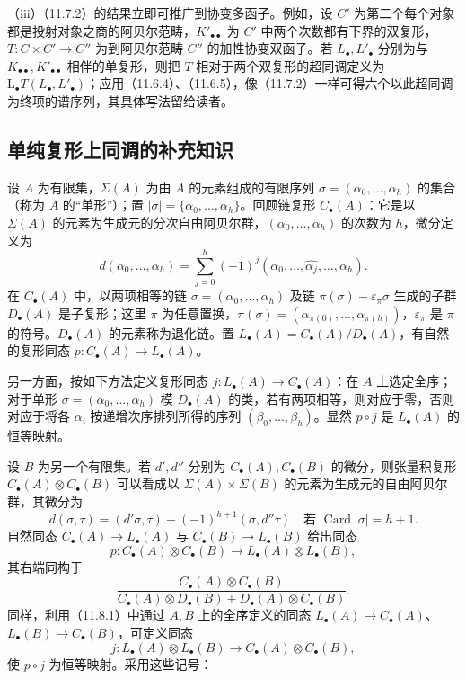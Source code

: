 （iii）（11.7.2）的结果立即可推广到协变多函子。例如，设 $C'$ 为第二个每个对象都是投射对象之商的阿贝尔范畴，$K'_{\bullet\bullet}$ 为 $C'$ 中两个次数都有下界的双复形，$T:C\times C'\to C''$ 为到阿贝尔范畴 $C''$ 的加性协变双函子。若 $L_\bullet,L'_\bullet$ 分别为与 $K_{\bullet\bullet},K'_{\bullet\bullet}$ 相伴的单复形，则把 $T$ 相对于两个双复形的超同调定义为 $\mathrm L_\bullet T(L_\bullet,L'_\bullet)$；应用（11.6.4）、（11.6.5），像（11.7.2）一样可得六个以此超同调为终项的谱序列，其具体写法留给读者。\par

\subsection{单纯复形上同调的补充知识}
设 $A$ 为有限集，$\Sigma(A)$ 为由 $A$ 的元素组成的有限序列 $\sigma=(\alpha_0,\ldots,\alpha_h)$ 的集合（称为 $A$ 的“单形”）；置 $|\sigma|=\{\alpha_0,\ldots,\alpha_h\}$。回顾链复形 $C_\bullet(A)$：它是以 $\Sigma(A)$ 的元素为生成元的分次自由阿贝尔群，$(\alpha_0,\ldots,\alpha_h)$ 的次数为 $h$，微分定义为
\[
d(\alpha_0,\ldots,\alpha_h)
=\sum_{j=0}^h(-1)^j(\alpha_0,\ldots,\widehat{\alpha_j},\ldots,\alpha_h).
\]
在 $C_\bullet(A)$ 中，以两项相等的链 $\sigma=(\alpha_0,\ldots,\alpha_h)$ 及链 $\pi(\sigma)-\varepsilon_\pi\sigma$ 生成的子群 $D_\bullet(A)$ 是子复形；这里 $\pi$ 为任意置换，$\pi(\sigma)=(\alpha_{\pi(0)},\ldots,\alpha_{\pi(h)})$，$\varepsilon_\pi$ 是 $\pi$ 的符号。$D_\bullet(A)$ 的元素称为退化链。置 $L_\bullet(A)=C_\bullet(A)/D_\bullet(A)$，有自然的复形同态 $p:C_\bullet(A)\to L_\bullet(A)$。

另一方面，按如下方法定义复形同态 $j:L_\bullet(A)\to C_\bullet(A)$：在 $A$ 上选定全序；对于单形 $\sigma=(\alpha_0,\ldots,\alpha_h)$ 模 $D_\bullet(A)$ 的类，若有两项相等，则对应于零，否则对应于将各 $\alpha_i$ 按递增次序排列所得的序列 $(\beta_0,\ldots,\beta_h)$。显然 $p\circ j$ 是 $L_\bullet(A)$ 的恒等映射。

设 $B$ 为另一个有限集。若 $d',d''$ 分别为 $C_\bullet(A),C_\bullet(B)$ 的微分，则张量积复形 $C_\bullet(A)\otimes C_\bullet(B)$ 可以看成以 $\Sigma(A)\times\Sigma(B)$ 的元素为生成元的自由阿贝尔群，其微分为
\[
d(\sigma,\tau)=(d'\sigma,\tau)+(-1)^{h+1}(\sigma,d''\tau)
\quad\text{若 }\operatorname{Card}|\sigma|=h+1.
\]
自然同态 $C_\bullet(A)\to L_\bullet(A)$ 与 $C_\bullet(B)\to L_\bullet(B)$ 给出同态
\[
p:C_\bullet(A)\otimes C_\bullet(B)\longrightarrow L_\bullet(A)\otimes L_\bullet(B),
\]
其右端同构于
\[
\frac{C_\bullet(A)\otimes C_\bullet(B)}
{C_\bullet(A)\otimes D_\bullet(B)+D_\bullet(A)\otimes C_\bullet(B)}.
\]
同样，利用（11.8.1）中通过 $A,B$ 上的全序定义的同态 $L_\bullet(A)\to C_\bullet(A)$、$L_\bullet(B)\to C_\bullet(B)$，可定义同态
\[
j:L_\bullet(A)\otimes L_\bullet(B)\longrightarrow C_\bullet(A)\otimes C_\bullet(B),
\]
使 $p\circ j$ 为恒等映射。采用这些记号：

